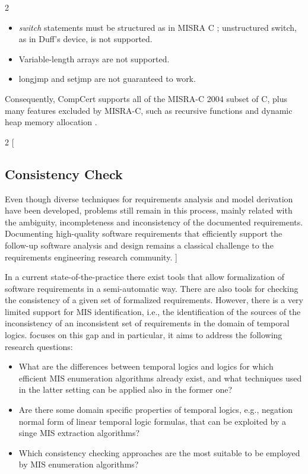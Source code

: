 \begin{minipage}{\linewidth}
\begin{multicols*}{2}
\begin{itemize}
			\item \textit{switch} statements must be structured as in MISRA C \cite{MISRA2004}; unstructured switch, as in Duff’s device, is not supported. 
			\item Variable-length arrays are not supported.
			\item longjmp and setjmp are not guaranteed to work.
		\end{itemize}
		Consequently, CompCert supports all of the MISRA-C 2004 subset of C, plus many features excluded by MISRA-C, such as recursive functions and dynamic heap memory allocation \cite{CompCert}.
	\end{multicols*}
\end{minipage}

\begin{minipage}{\linewidth}
	\begin{multicols*}{2}
		[
		\vspace{6 mm}
		\subsection{Consistency Check}
		Even though diverse techniques for requirements analysis and model derivation have been developed, problems still remain in this process, mainly related with the ambiguity, incompleteness and inconsistency of the documented requirements. Documenting high-quality software requirements \cite{Ieee1998} that efficiently support the follow-up software analysis and design remains a classical challenge to the requirements engineering research community. ]
		
		In a current state-of-the-practice there exist tools that allow formalization of software requirements in a semi-automatic way. There
		are also tools for checking the consistency of a given set of formalized requirements. However, there is a very limited support for
		\gls{MIS} identification, i.e., the identification of the sources of the inconsistency of an inconsistent set of requirements in the domain
		of temporal logics. \cite{Bendik:2017:CCR:3092703.3098239} focuses on this gap and in particular, it aims to address the following research questions:
		\begin{itemize}
			\item What are the differences between temporal logics and logics for which efficient \gls{MIS} enumeration algorithms already
			exist, and what techniques used in the latter setting can be
			applied also in the former one?
			\item Are there some domain specific properties of temporal
			logics, e.g., negation normal form of linear temporal logic formulas, that 	can be exploited by a singe \gls{MIS} extraction algorithms?
			\item Which consistency checking approaches are the most suitable to be employed by \gls{MIS} enumeration algorithms?
		\end{itemize}
		 

\end{multicols*}
\end{minipage}
